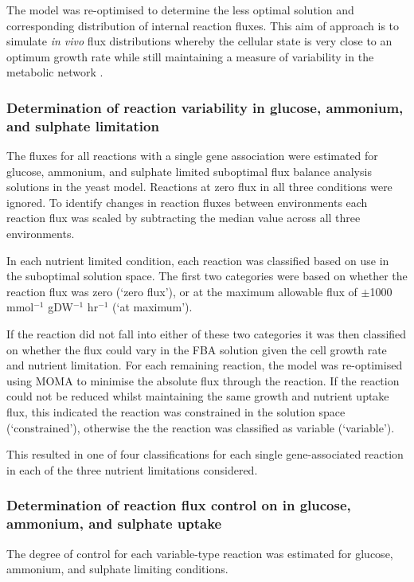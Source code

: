 The model was re-optimised to determine the less optimal solution and corresponding distribution of internal reaction fluxes. This aim of approach is to simulate \emph{in vivo} flux distributions whereby the cellular state is very close to an optimum growth rate while still maintaining a measure of variability in the metabolic network \cite{mahadevan2003}.

\subsubsection{Determination of reaction variability in glucose, ammonium, and sulphate limitation}

The fluxes for all reactions with a single gene association were estimated for glucose, ammonium, and sulphate limited suboptimal flux balance analysis solutions in the yeast model. Reactions at zero flux in all three conditions were ignored. To identify changes in reaction fluxes between environments each reaction flux was scaled by subtracting the median value across all three environments.

In each nutrient limited condition, each reaction was classified based on use in the suboptimal solution space.  The first two categories were based on whether the reaction flux was zero (`zero flux'), or at the maximum allowable flux of $\pm$1000 mmol$^{-1}$ gDW$^{-1}$ hr$^{-1}$ (`at maximum').

If the reaction did not fall into either of these two categories it was then classified on whether the flux could vary in the FBA solution given the cell growth rate and nutrient limitation. For each remaining reaction, the model was re-optimised using MOMA to minimise the absolute flux through the reaction. If the reaction could not be reduced whilst maintaining the same growth and nutrient uptake flux, this indicated the reaction was constrained in the solution space (`constrained'), otherwise the the reaction was classified as variable (`variable').

This resulted in one of four classifications for each single gene-associated reaction in each of the three nutrient limitations considered.

\subsubsection{Determination of reaction flux control on in glucose, ammonium, and sulphate uptake}

The degree of control for each variable-type reaction was estimated for glucose, ammonium, and sulphate limiting conditions.

